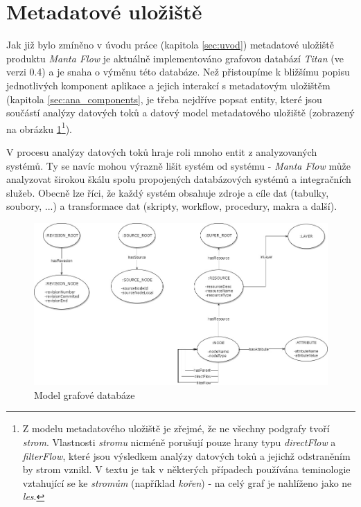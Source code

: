 \section{Metadatové uložiště}
\label{sec:ana_model}
Jak již bylo zmíněno v úvodu práce (kapitola \ref{sec:uvod}) metadatové uložiště produktu \textit{Manta Flow} je aktuálně implementováno grafovou databází \textit{Titan} (ve verzi 0.4) a je snaha o výměnu této databáze\cite{Kovar18}.
Než přistoupíme k bližšímu popisu jednotlivých komponent aplikace a jejich interakcí s metadatovým uložištěm (kapitola \ref{sec:ana_components}, je třeba nejdříve popsat entity, které jsou součástí analýzy datových toků a datový model metadatového uložiště (zobrazený na obrázku \ref{fig:ana-model}\footnote{Z modelu metadatového uložiště je zřejmé, že ne všechny podgrafy tvoří \textit{strom}. Vlastnosti \textit{stromu} nicméně porušují pouze hrany typu \textit{directFlow} a \textit{filterFlow}, které jsou výsledkem analýzy datových toků a jejichž odstraněním by strom vznikl. V textu je tak v některých případech používána teminologie vztahující se ke \textit{stromům} (například \textit{kořen}) - na celý graf je nahlíženo jako ne \textit{les}.}).

V procesu analýzy datových toků hraje roli mnoho entit z analyzovaných systémů. Ty se navíc mohou výrazně lišit systém od systému - \textit{Manta Flow} může analyzovat širokou škálu spolu propojených databázových systémů a integračních služeb. Obecně lze říci, že každý systém obsahuje zdroje a cíle dat (tabulky, soubory, ...) a transformace dat (skripty, \textit{} workflow, procedury, makra a další).

\begin{figure}
\begin{center}
\includegraphics[width=14cm]{figures/model}
\caption{Model grafové databáze}
\label{fig:ana-model}
\end{center}
\end{figure}

